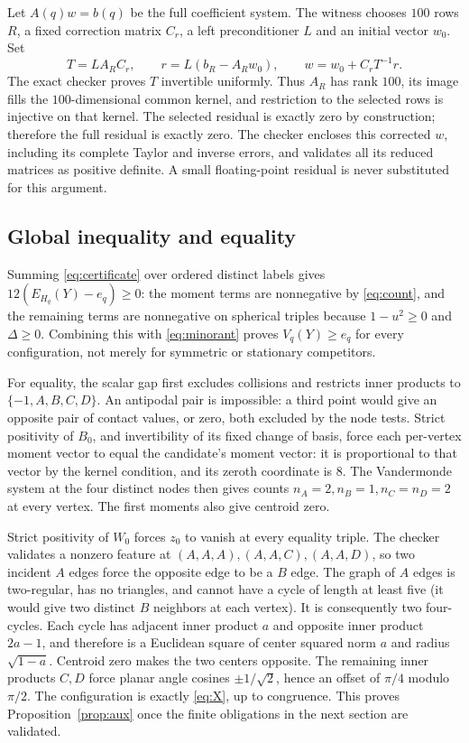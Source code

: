 \documentclass[11pt,reqno]{amsart}
\theoremstyle{remark}\newtheorem{remark}[theorem]{Remark}
\numberwithin{equation}{section}
\begin{document}
Let $A(q)w=b(q)$ be the full coefficient system. The witness chooses $100$
rows $R$, a fixed correction matrix $C_r$, a left preconditioner $L$ and
an initial vector $w_0$. Set
\[
 T=LA_RC_r,\qquad r=L(b_R-A_Rw_0),\qquad
 w=w_0+C_rT^{-1}r.
\]
The exact checker proves $T$ invertible uniformly. Thus $A_R$ has rank
$100$, its image fills the $100$-dimensional common kernel, and restriction
to the selected rows is injective on that kernel. The selected residual
is exactly zero by construction; therefore the full residual is exactly
zero. The checker encloses this corrected $w$, including its complete
Taylor and inverse errors, and validates all its reduced matrices as
positive definite. A small floating-point residual is never substituted
for this argument.

\subsection{Global inequality and equality}
Summing \eqref{eq:certificate} over ordered distinct labels gives
$12(E_{H_q}(Y)-e_q)\ge0$: the moment terms are nonnegative by
\eqref{eq:count}, and the remaining terms are nonnegative on spherical
triples because $1-u^2\ge0$ and $\Delta\ge0$. Combining this with
\eqref{eq:minorant} proves $V_q(Y)\ge e_q$ for every configuration, not
merely for symmetric or stationary competitors.

For equality, the scalar gap first excludes collisions and restricts
inner products to $\{-1,A,B,C,D\}$. An antipodal pair is impossible: a
third point would give an opposite pair of contact values, or zero, both
excluded by the node tests. Strict positivity of $B_0$, and invertibility
of its fixed change of basis, force each per-vertex moment vector to equal
the candidate's moment vector: it is proportional to that vector by the
kernel condition, and its zeroth coordinate is $8$. The Vandermonde system
at the four distinct nodes then gives counts $n_A=2,n_B=1,n_C=n_D=2$ at
every vertex. The first moments also give centroid zero.

Strict positivity of $W_0$ forces $z_0$ to vanish at every equality triple.
The checker validates a nonzero feature at $(A,A,A),(A,A,C),(A,A,D)$,
so two incident $A$ edges force the opposite edge to be a $B$ edge.
The graph of $A$ edges is two-regular, has no triangles, and cannot have
a cycle of length at least five (it would give two distinct $B$ neighbors
at each vertex). It is consequently two four-cycles. Each cycle has
adjacent inner product $a$ and opposite inner product $2a-1$, and therefore
is a Euclidean square of center squared norm $a$ and radius
$\sqrt{1-a}$. Centroid zero makes the two centers opposite. The remaining
inner products $C,D$ force planar angle cosines $\pm1/\sqrt2$, hence an
offset of $\pi/4$ modulo $\pi/2$. The configuration is exactly
\eqref{eq:X}, up to congruence. This proves Proposition~\ref{prop:aux}
once the finite obligations in the next section are validated.
\end{document}
